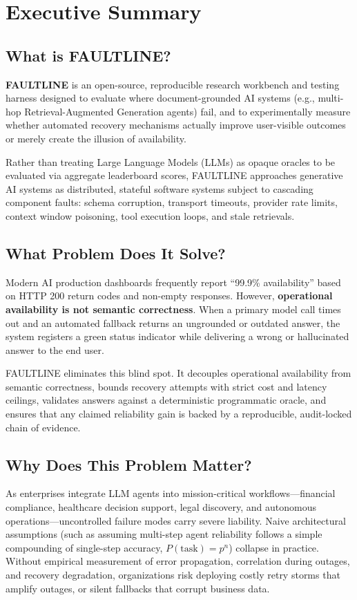 \section{Executive Summary}

\subsection{What is FAULTLINE?}
\textbf{FAULTLINE} is an open-source, reproducible research workbench and testing harness designed to evaluate where document-grounded AI systems (e.g., multi-hop Retrieval-Augmented Generation agents) fail, and to experimentally measure whether automated recovery mechanisms actually improve user-visible outcomes or merely create the illusion of availability.

Rather than treating Large Language Models (LLMs) as opaque oracles to be evaluated via aggregate leaderboard scores, FAULTLINE approaches generative AI systems as distributed, stateful software systems subject to cascading component faults: schema corruption, transport timeouts, provider rate limits, context window poisoning, tool execution loops, and stale retrievals. 

\subsection{What Problem Does It Solve?}
Modern AI production dashboards frequently report ``99.9\% availability'' based on HTTP 200 return codes and non-empty responses. However, \textbf{operational availability is not semantic correctness}. When a primary model call times out and an automated fallback returns an ungrounded or outdated answer, the system registers a green status indicator while delivering a wrong or hallucinated answer to the end user. 

FAULTLINE eliminates this blind spot. It decouples operational availability from semantic correctness, bounds recovery attempts with strict cost and latency ceilings, validates answers against a deterministic programmatic oracle, and ensures that any claimed reliability gain is backed by a reproducible, audit-locked chain of evidence.

\subsection{Why Does This Problem Matter?}
As enterprises integrate LLM agents into mission-critical workflows---financial compliance, healthcare decision support, legal discovery, and autonomous operations---uncontrolled failure modes carry severe liability. Naive architectural assumptions (such as assuming multi-step agent reliability follows a simple compounding of single-step accuracy, $P(\text{task}) = p^n$) collapse in practice. Without empirical measurement of error propagation, correlation during outages, and recovery degradation, organizations risk deploying costly retry storms that amplify outages, or silent fallbacks that corrupt business data.

